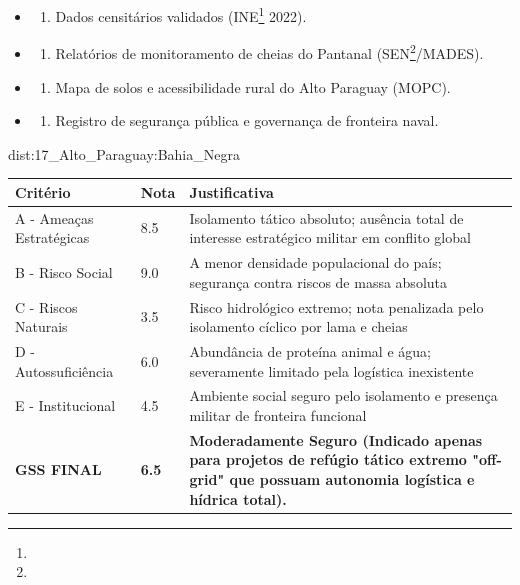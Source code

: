 {\begin{itemize}
\tightlist
\item
  \begin{enumerate}
  \def\labelenumi{\arabic{enumi})}
  \tightlist
  \item
    Dados censitários validados (INE\footnote{\fineINE} 2022).
  \end{enumerate}
\item
  \begin{enumerate}
  \def\labelenumi{\arabic{enumi})}
  \setcounter{enumi}{1}
  \tightlist
  \item
    Relatórios de monitoramento de cheias do Pantanal (SEN\footnote{\fineSEN}/\allowbreak MADES).
  \end{enumerate}
\item
  \begin{enumerate}
  \def\labelenumi{\arabic{enumi})}
  \setcounter{enumi}{2}
  \tightlist
  \item
    Mapa de solos e acessibilidade rural do Alto Paraguay (MOPC).
  \end{enumerate}
\item
  \begin{enumerate}
  \def\labelenumi{\arabic{enumi})}
  \setcounter{enumi}{3}
  \tightlist
  \item
    Registro de segurança pública e governança de fronteira naval.
  \end{enumerate}
\end{itemize}}{dist:17_Alto_Paraguay:Bahia_Negra}
\begin{table}[ht!]
\small \begin{tabular}{p{3.0cm}p{0.8cm}p{6.0cm}} \toprule
\textbf{Critério} & \textbf{Nota} & \textbf{Justificativa} \\ \midrule
A - Ameaças Estratégicas & 8.5 & Isolamento tático absoluto; ausência total de interesse estratégico militar em conflito global \\
B - Risco Social & 9.0 & A menor densidade populacional do país; segurança contra riscos de massa absoluta \\
C - Riscos Naturais & 3.5 & Risco hidrológico extremo; nota penalizada pelo isolamento cíclico por lama e cheias \\
D - Autossuficiência & 6.0 & Abundância de proteína animal e água; severamente limitado pela logística inexistente \\
E - Institucional & 4.5 & Ambiente social seguro pelo isolamento e presença militar de fronteira funcional \\
\midrule \textbf{GSS FINAL} & \textbf{6.5} & \textbf{Moderadamente Seguro (Indicado apenas para projetos de refúgio tático extremo "off-grid" que possuam autonomia logística e hídrica total).} \\ \bottomrule \end{tabular}
\end{table}
